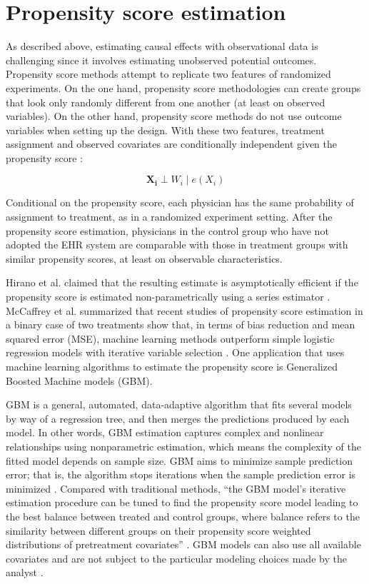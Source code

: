 \documentclass[12pt]{report}
\begin{document}
\section{Propensity score estimation}
As described above, estimating causal effects with observational data is challenging since it involves estimating unobserved potential outcomes. Propensity score methods attempt to replicate two features of randomized experiments. On the one hand, propensity score methodologies can create groups that look only randomly different from one another (at least on observed variables). On the other hand, propensity score methods do not use outcome variables when setting up the design. With these two features, treatment assignment and observed covariates are conditionally independent given the propensity score \citep{guo2014propensity}:

\begin{equation*}
\boldsymbol{X_i} \perp W_i \mid e(X_i)
\end{equation*}

Conditional on the propensity score, each physician has the same probability of assignment to treatment, as in a randomized experiment setting. After the propensity score estimation, physicians in the control group who have not adopted the EHR system are comparable with those in treatment groups with similar propensity scores, at least on observable characteristics. 

Hirano et al. claimed that the resulting estimate is asymptotically efficient if the propensity score is estimated non-parametrically using a series estimator \citep{hirano2003efficient}. McCaffrey et al. summarized that recent studies of propensity score estimation in a binary case of two treatments show that, in terms of bias reduction and mean squared error (MSE), machine learning methods outperform simple logistic regression models with iterative variable selection \citep{mccaffrey2013tutorial}. One application that uses machine learning algorithms to estimate the propensity score is Generalized Boosted Machine models (GBM).\label{place:gbm}

GBM is a general, automated, data-adaptive algorithm that fits several models by way of a regression tree, and then merges the predictions produced by each model. In other words, GBM estimation captures complex and nonlinear relationships using nonparametric estimation, which means the complexity of the fitted model depends on sample size. GBM aims to minimize sample prediction error; that is, the algorithm stops iterations when the sample prediction error is minimized \citep{guo2014propensity}. Compared with traditional methods, ``the GBM model's iterative estimation procedure can be tuned to find the propensity score model leading to the best balance between treated and control groups, where balance refers to the similarity between different groups on their propensity score weighted distributions of pretreatment covariates''  \citep{mccaffrey2013tutorial}. GBM models can also use all available covariates and are not subject to the particular modeling choices made by the analyst \citep{hillm2015short}. 
\end{document}
